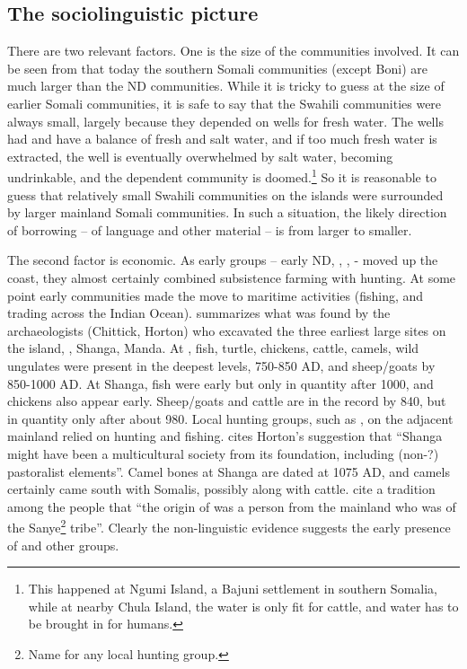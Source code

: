 \documentclass[output=paper
,newtxmath
,modfonts
,nonflat]{langsci/langscibook}
\begin{document}
\subsection{The sociolinguistic picture}\label{sec:nurse:5.3}  There are two relevant factors. One is the size of the communities involved. It can be seen from  that today the southern Somali communities (except Boni) are much larger than the ND communities. While it is tricky to guess at the size of earlier Somali communities, it is safe to say that the Swahili communities were always small, largely because they depended on wells for fresh water. The wells had and have a balance of fresh and salt water, and if too much fresh water is extracted, the well is eventually overwhelmed by salt water, becoming undrinkable, and the dependent community is doomed.\footnote{This happened at Ngumi Island, a Bajuni settlement in southern Somalia, while at nearby Chula Island, the water is only fit for cattle, and water has to be brought in for humans.}  So it is reasonable to guess that relatively small Swahili communities on the islands were surrounded by larger mainland Somali communities. In such a situation, the likely direction of borrowing – of language and other material – is from larger to smaller. 

  The second factor is economic. As early  groups – early ND, , ,  -  moved up the coast, they almost certainly combined subsistence farming with hunting. At some point early  communities made the move to maritime activities (fishing, and trading across the Indian Ocean). \citet{Wilson2016} summarizes what was found by the archaeologists (Chittick, Horton) who excavated the three earliest large sites on the island, , Shanga, Manda. At , fish, turtle, chickens, cattle, camels, wild ungulates were present in the deepest levels, 750-850 AD, and sheep/goats by 850-1000 AD. At Shanga, fish were early but only in quantity after 1000, and chickens also appear early. Sheep/goats and cattle are in the record by 840, but in quantity only after about 980. Local hunting groups, such as , on the adjacent mainland relied on hunting and fishing. \citet[132]{Wilson2016} cites Horton’s suggestion that “Shanga might have been a multicultural society from its foundation, including (non-?) pastoralist elements”. Camel bones at Shanga are dated at 1075 AD, and camels certainly came south with Somalis, possibly along with cattle. \citet[72]{Nurse1985} cite a tradition among the  people that “the origin of  was a person from the mainland who was of the Sanye\footnote{Name for any local hunting group.} tribe”. Clearly the non-linguistic evidence suggests the early presence of  and other groups.
\end{document}
